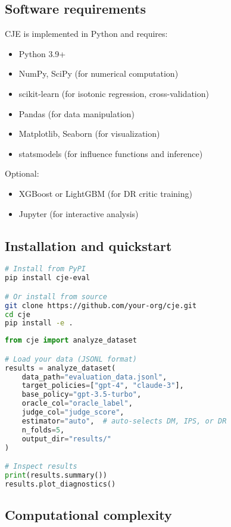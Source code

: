 \subsection{Software requirements}

CJE is implemented in Python and requires:
\begin{itemize}
\item Python 3.9+
\item NumPy, SciPy (for numerical computation)
\item scikit-learn (for isotonic regression, cross-validation)
\item Pandas (for data manipulation)
\item Matplotlib, Seaborn (for visualization)
\item statsmodels (for influence functions and inference)
\end{itemize}

Optional:
\begin{itemize}
\item XGBoost or LightGBM (for DR critic training)
\item Jupyter (for interactive analysis)
\end{itemize}

\subsection{Installation and quickstart}

\begin{lstlisting}[language=bash,caption=Installation]
# Install from PyPI
pip install cje-eval

# Or install from source
git clone https://github.com/your-org/cje.git
cd cje
pip install -e .
\end{lstlisting}

\begin{lstlisting}[language=Python,caption=Quickstart Example]
from cje import analyze_dataset

# Load your data (JSONL format)
results = analyze_dataset(
    data_path="evaluation_data.jsonl",
    target_policies=["gpt-4", "claude-3"],
    base_policy="gpt-3.5-turbo",
    oracle_col="oracle_label",
    judge_col="judge_score",
    estimator="auto",  # auto-selects DM, IPS, or DR
    n_folds=5,
    output_dir="results/"
)

# Inspect results
print(results.summary())
results.plot_diagnostics()
\end{lstlisting}

\subsection{Computational complexity}


